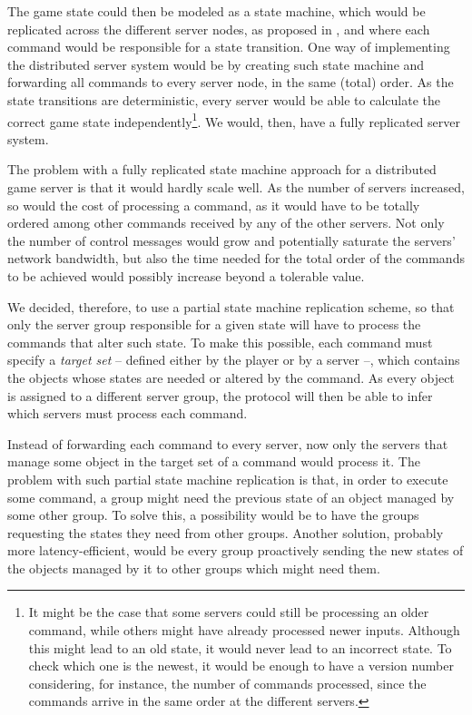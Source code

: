 \documentclass[]{usiinfprospectus}
\begin{document}
The game state could then be modeled as a state machine, which would be replicated across the different server nodes, as proposed in \cite{lamport1978ird,schneider1990ift,lampson1996hbh}, and where each command would be responsible for a state transition. One way of implementing the distributed server system would be by creating such state machine and forwarding all commands to every server node, in the same (total) order. As the state transitions are deterministic, every server would be able to calculate the correct game state independently\footnote{It might be the case that some servers could still be processing an older command, while others might have already processed newer inputs. Although this might lead to an old state, it would never lead to an incorrect state. To check which one is the newest, it would be enough to have a version number considering, for instance, the number of commands processed, since the commands arrive in the same order at the different servers.}. We would, then, have a fully replicated server system. 

The problem with a fully replicated state machine approach for a distributed game server is that it would hardly scale well. As the number of servers increased, so would the cost of processing a command, as it would have to be totally ordered among other commands received by any of the other servers. Not only the number of control messages would grow and potentially saturate the servers' network bandwidth, but also the time needed for the total order of the commands to be achieved would possibly increase beyond a tolerable value.

We decided, therefore, to use a partial state machine replication scheme, so that only the server group responsible for a given state will have to process the commands that alter such state. To make this possible, each command must specify a \emph{target set} -- defined either by the player or by a server --, which contains the objects whose states are needed or altered by the command. As every object is assigned to a different server group, the protocol will then be able to infer which servers must process each command.

Instead of forwarding each command to every server, now only the servers that manage some object in the target set of a command would process it. The problem with such partial state machine replication is that, in order to execute some command, a group might need the previous state of an object managed by some other group. To solve this, a possibility would be to have the groups requesting the states they need from other groups. Another solution, probably more latency-efficient, would be every group proactively sending the new states of the objects managed by it to other groups which might need them.
\end{document}
